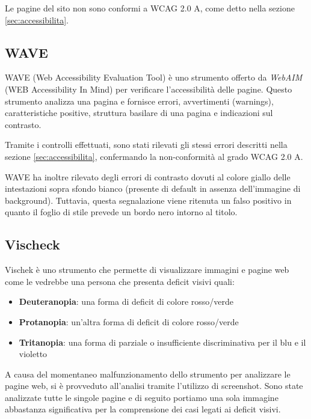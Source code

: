Le pagine del sito non sono conformi a WCAG 2.0 A, come detto nella sezione
\ref{sec:accessibilita}.

\subsection{WAVE} %
WAVE (Web Accessibility Evaluation Tool) è uno strumento offerto da
\textit{WebAIM} (WEB Accessibility In Mind) per verificare l'accessibilità
delle pagine. Questo strumento analizza una pagina e fornisce errori,
avvertimenti (warnings), caratteristiche positive, struttura basilare di una
pagina e indicazioni sul contrasto.

Tramite i controlli effettuati, sono stati rilevati gli stessi errori
descritti nella sezione \ref{sec:accessibilita}, confermando la non-conformità
al grado WCAG 2.0 A.

WAVE ha inoltre rilevato degli errori di contrasto dovuti al colore giallo
delle intestazioni sopra sfondo bianco (presente di default in assenza
dell'immagine di background). Tuttavia, questa segnalazione viene ritenuta un
falso positivo in quanto il foglio di stile prevede un bordo nero intorno al
titolo.

\subsection{Vischeck} %
Vischek è uno strumento che permette di visualizzare immagini e pagine web
come le vedrebbe una persona che presenta deficit visivi quali:
\begin{itemize}
\item \textbf{Deuteranopia}: una forma di deficit di colore rosso/verde
\item \textbf{Protanopia}: un'altra forma di deficit di colore rosso/verde
\item \textbf{Tritanopia}: una forma di parziale o insufficiente
discriminativa per il blu e il violetto
\end{itemize}
A causa del momentaneo malfunzionamento dello strumento per analizzare le
pagine web, si è provveduto all'analisi tramite l'utilizzo di screenshot. Sono
state analizzate tutte le singole pagine e di seguito portiamo una sola
immagine abbastanza significativa per la comprensione dei casi legati ai
deficit visivi.

